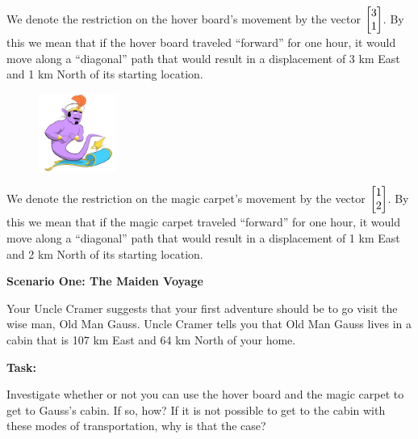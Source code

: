 \begin{iola}
\begin{minipage}{\textwidth}
	We denote the restriction on the hover board's movement by the vector
	$\mat{3 \\1}$. By this we mean that if
	the hover board traveled ``forward'' for one hour, it would move along a
	``diagonal'' path that would result in a displacement of 3 km East and
	1 km North of its starting location.
\end{minipage}

\begin{minipage}{\textwidth}
	\vspace{.5cm}
	\begin{figure}
	\vspace{-.8cm}
	\includegraphics[width=1in]{images/MagicCarpet-small.png}
	\end{figure}

	We denote the restriction on the magic carpet's movement by the vector
	$\mat{1 \\2 }$. By this we mean that if the
	magic carpet traveled ``forward'' for one hour, it would move along a
	``diagonal'' path that would result in a displacement of 1 km East and
	2 km North of its starting location.
\end{minipage}


\vspace{10mm}

\textbf{Scenario One: The Maiden Voyage}

Your Uncle Cramer suggests that your first adventure should be to go visit
the wise man, Old Man Gauss. Uncle Cramer tells you that Old Man Gauss
lives in a cabin that is 107 km East and 64 km North of your home.

\vspace{5mm}

\textbf{Task:}
\par
Investigate whether or not you can use the hover board and the magic
carpet to get to Gauss's cabin. If so, how? If it is not possible to
get to the cabin with these modes of transportation, why is that the case?

\end{iola}

